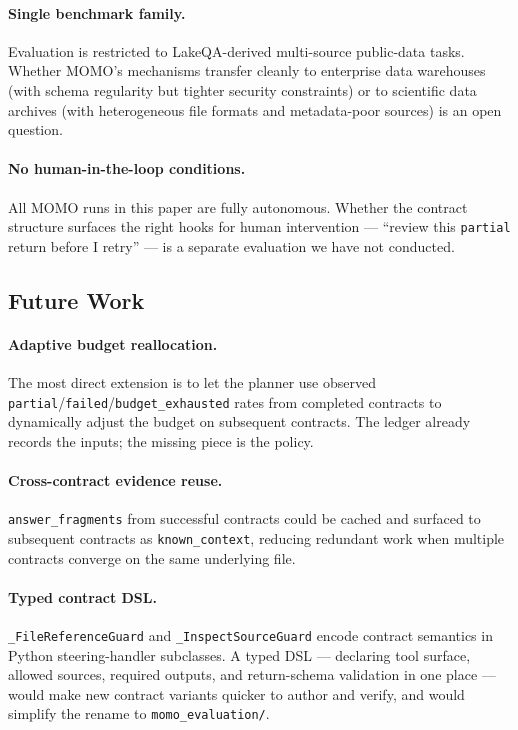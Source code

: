 \paragraph{Single benchmark family.} Evaluation is restricted to LakeQA-derived multi-source public-data tasks. Whether MOMO's mechanisms transfer cleanly to enterprise data warehouses (with schema regularity but tighter security constraints) or to scientific data archives (with heterogeneous file formats and metadata-poor sources) is an open question.

\paragraph{No human-in-the-loop conditions.} All MOMO runs in this paper are fully autonomous. Whether the contract structure surfaces the right hooks for human intervention --- ``review this \texttt{partial} return before I retry'' --- is a separate evaluation we have not conducted.

\subsection{Future Work}

\paragraph{Adaptive budget reallocation.} The most direct extension is to let the planner use observed \texttt{partial}/\texttt{failed}/\texttt{budget\_exhausted} rates from completed contracts to dynamically adjust the budget on subsequent contracts. The ledger already records the inputs; the missing piece is the policy.

\paragraph{Cross-contract evidence reuse.} \texttt{answer\_fragments} from successful contracts could be cached and surfaced to subsequent contracts as \texttt{known\_context}, reducing redundant work when multiple contracts converge on the same underlying file.

\paragraph{Typed contract DSL.} \texttt{\_FileReferenceGuard} and \texttt{\_InspectSourceGuard} encode contract semantics in Python steering-handler subclasses. A typed DSL --- declaring tool surface, allowed sources, required outputs, and return-schema validation in one place --- would make new contract variants quicker to author and verify, and would simplify the rename to \texttt{momo\_evaluation/}.

